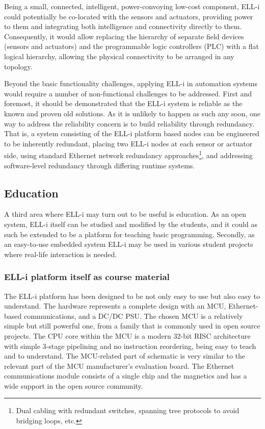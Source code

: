 \documentclass[final]{siamltex}
\begin{document}
Being a small, connected, intelligent, power-convoying low-cost
component, ELL-i could
potentially be co-located with the sensors and actuators, providing
power to them and integrating both intelligence and connectivity
directly to them.  Consequently, it would allow replacing the
hierarchy of separate field devices (sensors and actuators) and the
programmable logic controllers (PLC) with a flat logical hierarchy,
allowing the physical connectivity to be arranged in any topology.

Beyond the basic functionality challenges, applying ELL-i in
automation systems would require a number of non-functional challenges
to be addressed.  First and foremost, it should be demonstrated that
the ELL-i system is reliable as the known and proven old solutions.
As it is unlikely to happen as such any soon, one way to address the
reliability concern is to build reliability through redundancy.  That
is, a system consisting of the ELL-i platform based nodes can be
engineered to be inherently redundant, placing two ELL-i nodes at each
sensor or actuator side, using standard Ethernet network redundancy
approaches\footnote{Dual cabling with redundant switches, spanning
  tree protocols to avoid bridging loops, etc.}, and addressing
software-level redundancy through differing runtime systems.

\subsection{Education}

A third area where ELL-i may turn out to be useful is education.  As
an open system, ELL-i itself can be studied and modified by the
students, and it could as such be extended to be a platform for teaching
basic programming.  Secondly, as an easy-to-use embedded system ELL-i
may be used in various student projects where real-life interaction is
needed.

\subsubsection{ELL-i platform itself as course material}

The ELL-i platform has been designed to be not only easy to use but
also easy to understand.  The hardware represents a complete design
with an MCU, Ethernet-based communications, and a DC/DC PSU.  The
chosen MCU is a relatively simple but still powerful one, from a
family that is commonly used in open source projects.  The CPU core
within the MCU is a modern 32-bit RISC architecture with simple
3-stage pipelining and no instruction reordering, being easy to teach
and to understand.  The MCU-related part of schematic is very similar
to the relevant part of the MCU manufacturer's evaluation board.  The
Ethernet communications module consists of a single chip and the
magnetics and has a wide support in the open source community.
\end{document}
